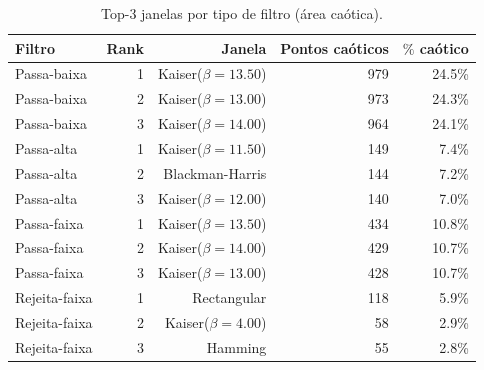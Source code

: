 \begin{table}[htbp]
  \centering
  \caption{Top-3 janelas por tipo de filtro (área caótica).}
  \begin{tabular}{lrrrr}
    \toprule
    Filtro & Rank & Janela & Pontos caóticos & $\%$ caótico \\
    \midrule
    Passa-baixa & 1 & Kaiser($\beta=13.50$) & 979 & 24.5\% \\
    Passa-baixa & 2 & Kaiser($\beta=13.00$) & 973 & 24.3\% \\
    Passa-baixa & 3 & Kaiser($\beta=14.00$) & 964 & 24.1\% \\
    Passa-alta & 1 & Kaiser($\beta=11.50$) & 149 & 7.4\% \\
    Passa-alta & 2 & Blackman-Harris & 144 & 7.2\% \\
    Passa-alta & 3 & Kaiser($\beta=12.00$) & 140 & 7.0\% \\
    Passa-faixa & 1 & Kaiser($\beta=13.50$) & 434 & 10.8\% \\
    Passa-faixa & 2 & Kaiser($\beta=14.00$) & 429 & 10.7\% \\
    Passa-faixa & 3 & Kaiser($\beta=13.00$) & 428 & 10.7\% \\
    Rejeita-faixa & 1 & Rectangular & 118 & 5.9\% \\
    Rejeita-faixa & 2 & Kaiser($\beta=4.00$) & 58 & 2.9\% \\
    Rejeita-faixa & 3 & Hamming & 55 & 2.8\% \\
    \bottomrule
  \end{tabular}
\end{table}
